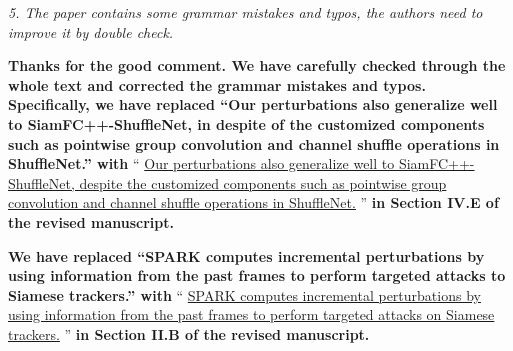 \documentclass[12pt]{article}
\begin{document}
\textit{5. The paper contains some grammar mistakes and typos, the authors need to improve it by double check.}

\textbf{
Thanks for the good comment. We have carefully checked through the whole text and corrected the grammar mistakes and typos. 
Specifically, we have replaced ``Our perturbations also generalize well to SiamFC++-ShuffleNet, in despite of the customized components such as pointwise group convolution and channel shuffle operations in ShuffleNet.'' with}
``
\uline{Our perturbations also generalize well to SiamFC++-ShuffleNet, despite the customized components such as pointwise group convolution and channel shuffle operations in ShuffleNet.}
''
\textbf{in Section IV.E of the revised manuscript.}

\textbf{
We have replaced ``SPARK computes incremental perturbations by using information from the past frames to perform targeted attacks to Siamese trackers.'' with}
``
\uline{SPARK computes incremental perturbations by using information from the past frames to perform targeted attacks on Siamese trackers.}
''
\textbf{in Section II.B of the revised manuscript.}

\normalem


\end{document}
